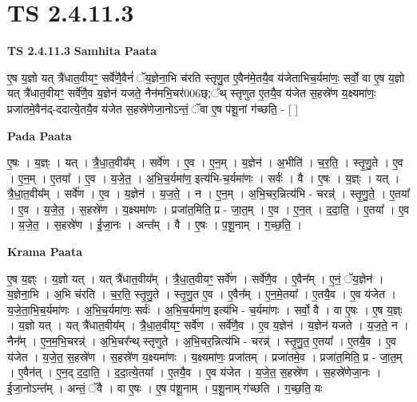 \documentclass[17pt]{extarticle}
\begin{document}
\section{ TS 2.4.11.3 }

\textbf{TS 2.4.11.3 } \newline
\textbf{Samhita Paata} \newline

ए॒ष य॒ज्ञो यत् त्रै॑धात॒वीयꣳ॒॒ सर्वे॑णै॒वैनं॑ ॅय॒ज्ञेना॒भि च॑रति स्तृणु॒त ए॒वैन॑मे॒तयै॒व य॑जेताभिच॒र्यमा॑णः॒ सर्वो॒ वा ए॒ष य॒ज्ञो यत् त्रै॑धात॒वीयꣳ॒॒ सर्वे॑णै॒व य॒ज्ञेन॑ यजते॒ नैन॑मभि॒चर॑006छ्;᳚थ् स्तृणुत ए॒तयै॒व य॑जेत स॒हस्रे॑ण य॒क्ष्यमा॑णः॒ प्रजा॑तमे॒वैन॑द्-ददात्ये॒तयै॒व य॑जेत स॒हस्रे॑णेजा॒नोऽन्तं॒ ॅवा ए॒ष प॑शू॒नां ग॑च्छति॒ - [  ] \newline

\textbf{Pada Paata} \newline

ए॒षः । य॒ज्ञ्ः । यत् । त्रै॒धा॒त॒वीय᳚म् ।   सर्वे॑ण । ए॒व । ए॒न॒म् । य॒ज्ञेन॑ । अ॒भीति॑ । च॒र॒ति॒ । स्तृ॒णु॒ते । ए॒व । ए॒न॒म् । ए॒तया᳚ ।   ए॒व । य॒जे॒त॒ । अ॒भि॒च॒र्यमा॑ण॒ इत्य॑भि-च॒र्यमा॑णः । सर्वः॑ । वै । ए॒षः । य॒ज्ञ्ः । यत् । त्रै॒धा॒त॒वीय᳚म् । सर्वे॑ण । ए॒व । य॒ज्ञेन॑ । य॒ज॒ते॒ । न । ए॒न॒म् । अ॒भि॒चर॒न्नित्य॑भि - चरन्न्॑ । स्तृ॒णु॒ते॒ । ए॒तया᳚ । ए॒व । य॒जे॒त॒ । स॒हस्रे॑ण । य॒क्ष्यमा॑णः । प्रजा॑त॒मिति॒ प्र - जा॒त॒म् । ए॒व । ए॒न॒त् । द॒दा॒ति॒ । ए॒तया᳚ । ए॒व । य॒जे॒त॒ । स॒हस्रे॑ण । ई॒जा॒नः । अन्त᳚म् । वै । ए॒षः । प॒शू॒नाम् । ग॒च्छ॒ति॒ ।  \newline


\textbf{Krama Paata} \newline

ए॒ष य॒ज्ञ्ः । य॒ज्ञो यत् । यत् त्रै॑धात॒वीय᳚म् । त्रै॒धा॒त॒वीयꣳ॒॒ सर्वे॑ण । सर्वे॑णै॒व । ए॒वैन᳚म् । ए॒नं॒ ॅय॒ज्ञेन॑ । य॒ज्ञेना॒भि । अ॒भि च॑रति । च॒र॒ति॒ स्तृ॒णु॒ते । स्तृ॒णु॒त ए॒व । ए॒वैन᳚म् । ए॒न॒मे॒तया᳚ । ए॒तयै॒व । ए॒व य॑जेत । य॒जे॒ता॒भि॒च॒र्यमा॑णः । अ॒भि॒च॒र्यमा॑णः॒ सर्वः॑ । अ॒भि॒च॒र्यमा॑ण॒ इत्य॑भि - च॒र्यमा॑णः । सर्वो॒ वै । वा ए॒षः । ए॒ष य॒ज्ञ्ः । य॒ज्ञो यत् । यत् त्रै॑धात॒वीय᳚म् । त्रै॒धा॒त॒वीयꣳ॒॒ सर्वे॑ण । सर्वे॑णै॒व । ए॒व य॒ज्ञेन॑ । य॒ज्ञेन॑ यजते । य॒ज॒ते॒ न । नैन᳚म् । ए॒न॒म॒भि॒चरन्न्॑ । अ॒भि॒चर᳚न्थ् स्तृणुते । अ॒भि॒चर॒न्नित्य॑भि - चरन्न्॑ । स्तृ॒णु॒त॒ ए॒तया᳚ । ए॒तयै॒व । ए॒व य॑जेत । य॒जे॒त॒ स॒हस्रे॑ण । स॒हस्रे॑ण य॒क्ष्यमा॑णः । य॒क्ष्यमा॑णः॒ प्रजा॑तम् । प्रजा॑तमे॒व । प्रजा॑त॒मिति॒ प्र - जा॒त॒म् । ए॒वैन॑त् । ए॒न॒द् द॒दा॒ति॒ । द॒दा॒त्ये॒तया᳚ । ए॒तयै॒व । ए॒व य॑जेत । य॒जे॒त॒ स॒हस्रे॑ण । स॒हस्रे॑णेजा॒नः । ई॒जा॒नोऽन्त᳚म् । अन्तं॒ ॅवै । वा ए॒षः । ए॒ष प॑शू॒नाम् । प॒शू॒नाम् ग॑च्छति । ग॒च्छ॒ति॒ यः \newline
\end{document}
